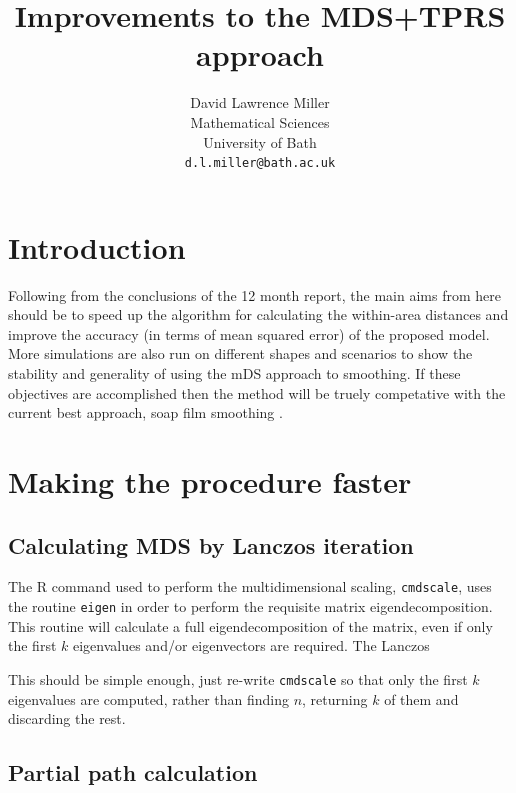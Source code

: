 \documentclass[a4paper,10pt]{article}
\title{Improvements to the MDS+TPRS approach}
\author{David Lawrence Miller\\Mathematical Sciences\\University of Bath\\\texttt{d.l.miller@bath.ac.uk}}
\begin{document}
 
 
 
\newtheorem{thm}{Theorem}[section]
 
\newtheorem{defn}{Definition}[section]
 
\maketitle

\section{Introduction}

Following from the conclusions of the 12 month report, the main aims from here should be to speed up the algorithm for calculating the within-area distances and improve the accuracy (in terms of mean squared error) of the proposed model. More simulations are also run on different shapes and scenarios to show the stability and generality of using the mDS approach to smoothing. If these objectives are accomplished then the method will be truely competative with the current best approach, soap film smoothing \cite{soap}.


\section{Making the procedure faster}


\subsection{Calculating MDS by Lanczos iteration}

The \textsf{R} command used to perform the multidimensional scaling, \texttt{cmdscale}, uses the routine \texttt{eigen} in order to perform the requisite matrix eigendecomposition. This routine will calculate a full eigendecomposition of the matrix, even if only the first $k$ eigenvalues and/or eigenvectors are required. The Lanczos 

This should be simple enough, just re-write \texttt{cmdscale} so that only the first $k$ eigenvalues are computed, rather than finding $n$, returning $k$ of them and discarding the rest.

\subsection{Partial path calculation}
\end{document}
